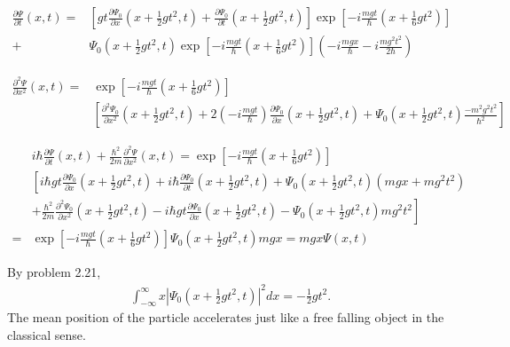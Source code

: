 \begin{align*}
    \frac{\partial \Psi}{\partial t}(x,t)
    =&
    \left[gt\frac{\partial \Psi_0}{\partial x}(x+\frac{1}{2}gt^2,t)+\frac{\partial \Psi_0}{\partial t}(x+\frac{1}{2}gt^2,t)\right]
    \exp\left[-i\frac{mgt}{\hbar}\left(x+\frac{1}{6}gt^2\right)\right]
    \\+&
    \Psi_0(x+\frac{1}{2}gt^2,t)
    \exp\left[-i\frac{mgt}{\hbar}\left(x+\frac{1}{6}gt^2\right)\right]
    \left(-i\frac{mgx}{\hbar}-i\frac{mg^2t^2}{2\hbar}\right)
\end{align*}

\begin{align*}
    \frac{\partial^2 \Psi}{\partial x^2}(x,t)
    =&\exp\left[-i\frac{mgt}{\hbar}\left(x+\frac{1}{6}gt^2\right)\right]\\
    &
    \left[\frac{\partial^2 \Psi_0}{\partial x^2}(x+\frac{1}{2}gt^2,t)
    +2\left(-i\frac{mgt}{\hbar}\right)
    \frac{\partial \Psi_0}{\partial x}(x+\frac{1}{2}gt^2,t)
    +\Psi_0(x+\frac{1}{2}gt^2,t)
    \frac{-m^2g^2t^2}{\hbar^2}
    \right]
\end{align*}

\begin{align*}
    &i\hbar\frac{\partial \Psi}{\partial t}(x,t)+
    \frac{\hbar^2}{2m}\frac{\partial^2 \Psi}{\partial x^2}(x,t)
    =
    \exp\left[-i\frac{mgt}{\hbar}\left(x+\frac{1}{6}gt^2\right)\right]
    \\
    &\left[
    i\hbar
    gt\frac{\partial \Psi_0}{\partial x}(x+\frac{1}{2}gt^2,t)+
    i\hbar\frac{\partial \Psi_0}{\partial t}(x+\frac{1}{2}gt^2,t)
    +
    \Psi_0(x+\frac{1}{2}gt^2,t)
    (mgx+mg^2t^2)\right.\\
    &\left.
    +\frac{\hbar^2}{2m}\frac{\partial^2 \Psi_0}{\partial x^2}(x+\frac{1}{2}gt^2,t)
    -i\hbar gt
    \frac{\partial \Psi_0}{\partial x}(x+\frac{1}{2}gt^2,t)
    -\Psi_0(x+\frac{1}{2}gt^2,t)
    mg^2t^2
    \right]\\
    =&
    \exp\left[-i\frac{mgt}{\hbar}\left(x+\frac{1}{6}gt^2\right)\right]
    \Psi_0(x+\frac{1}{2}gt^2,t)mgx=mgx\Psi(x,t)
\end{align*}

By problem 2.21,
\begin{align*}
    \int_{-\infty}^{\infty}
    x|\Psi_0(x+\frac{1}{2}gt^2,t)|^2dx
    =-\frac{1}{2}gt^2.
\end{align*}
The mean position of the particle accelerates just like a free falling object in the classical sense.

